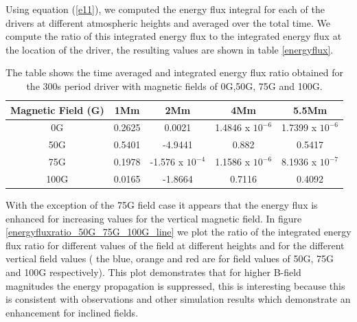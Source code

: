 \documentclass{aastex62}
\begin{document}
Using equation (\ref{e11}), we computed the energy flux integral for each of the drivers at different atmospheric heights and averaged over the total time. We compute the ratio of this integrated energy flux to the integrated energy flux at the location of the driver, the resulting values are shown in table \ref{energyflux}.

\begin{table}\label{energyflux}
\centering
\begin{tabular}{c c c c c}
\hline
Magnetic Field (G)   &  1Mm  &  2Mm &  4Mm & 5.5Mm \\
\hline
0G & 0.2625  &    0.0021      &   1.4846 x $10^{-6}$     &   1.7399 x $10^{-6}$      \\
\hline
50G & 0.5401  &   -4.9441       &   0.882      &  0.5417     \\
\hline
75G & 0.1978  &    -1.576 x $10^{-4}$      &   1.1586 x $10^{-6}$     &   8.1936 x $10^{-7}$      \\
\hline
100G & 0.0165  &   -1.8664      &   0.7116      &   0.4092    \\
\hline

\end{tabular} 
\caption{The table shows the time averaged and integrated energy flux ratio obtained  for the 300s period driver with magnetic fields of 0G,50G, 75G and 100G.}
\label{energyfluxratio}
\end{table}

With the exception of the 75G field case it appears that the energy flux is enhanced for increasing values for the vertical magnetic field. In figure \ref{energyfluxratio_50G_75G_100G_line} we plot the ratio of the integrated energy flux ratio for different values of the field at different heights and for the different vertical field values ( the blue, orange and red  are for field values of 50G, 75G and 100G respectively). This plot demonstrates that for higher B-field magnitudes the energy propagation is suppressed, this is interesting because this is consistent with observations and other simulation results which demonstrate an enhancement for inclined fields.

\end{document}
